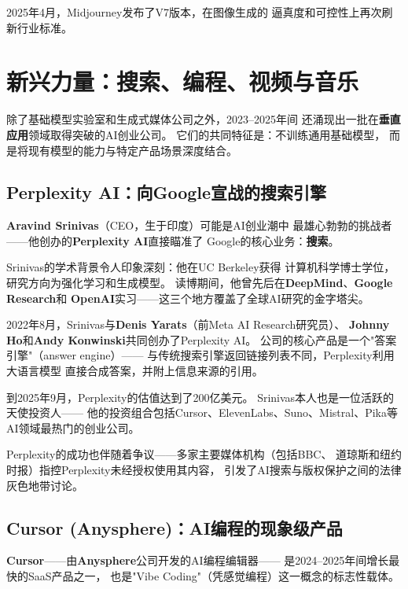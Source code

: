 2025年4月，Midjourney发布了V7版本，在图像生成的
逼真度和可控性上再次刷新行业标准。


\section{新兴力量：搜索、编程、视频与音乐}
\label{sec:emerging}

除了基础模型实验室和生成式媒体公司之外，2023--2025年间
还涌现出一批在\textbf{垂直应用}领域取得突破的AI创业公司。
它们的共同特征是：不训练通用基础模型，
而是将现有模型的能力与特定产品场景深度结合。

\subsection{Perplexity AI：向Google宣战的搜索引擎}

\textbf{Aravind Srinivas}（CEO，生于印度）可能是AI创业潮中
最雄心勃勃的挑战者——他创办的\textbf{Perplexity AI}直接瞄准了
Google的核心业务：\textbf{搜索}。

Srinivas的学术背景令人印象深刻：他在UC Berkeley获得
计算机科学博士学位，研究方向为强化学习和生成模型。
读博期间，他曾先后在\textbf{DeepMind}、\textbf{Google Research}和
\textbf{OpenAI}实习——这三个地方覆盖了全球AI研究的金字塔尖。

2022年8月，Srinivas与\textbf{Denis Yarats}（前Meta AI Research研究员）、
\textbf{Johnny Ho}和\textbf{Andy Konwinski}共同创办了Perplexity AI。
公司的核心产品是一个"答案引擎"（answer engine）——
与传统搜索引擎返回链接列表不同，Perplexity利用大语言模型
直接合成答案，并附上信息来源的引用。

到2025年9月，Perplexity的估值达到了200亿美元。
Srinivas本人也是一位活跃的天使投资人——
他的投资组合包括Cursor、ElevenLabs、Suno、Mistral、Pika等
AI领域最热门的创业公司。

Perplexity的成功也伴随着争议——多家主要媒体机构（包括BBC、
道琼斯和纽约时报）指控Perplexity未经授权使用其内容，
引发了AI搜索与版权保护之间的法律灰色地带讨论。

\subsection{Cursor (Anysphere)：AI编程的现象级产品}

\textbf{Cursor}——由\textbf{Anysphere}公司开发的AI编程编辑器——
是2024--2025年间增长最快的SaaS产品之一，
也是"Vibe Coding"（凭感觉编程）这一概念的标志性载体。

